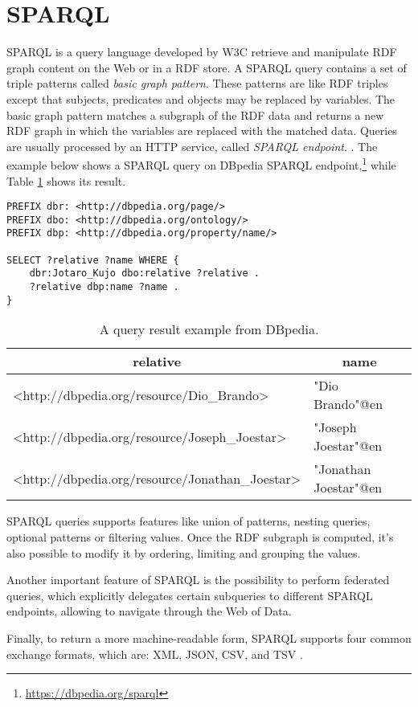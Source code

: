 \section{SPARQL}
\label{sec:sparql}

\ac{SPARQL} is a query language developed by \ac{W3C} retrieve and manipulate \ac{RDF} graph content on the Web or in a \ac{RDF} store. A \ac{SPARQL} query contains a set of triple patterns called \textit{basic graph pattern}. These patterns are like \ac{RDF} triples except that subjects, predicates and objects may be replaced by variables. The basic graph pattern matches a subgraph of the \ac{RDF} data and returns a new \ac{RDF} graph in which the variables are replaced with the matched data. Queries are usually processed by an \ac{HTTP} service, called \textit{\ac{SPARQL} endpoint}. \cite{world2013sparql}. The example below shows a \ac{SPARQL} query on DBpedia \ac{SPARQL} endpoint,\footnote{\url{https://dbpedia.org/sparql}} while Table \ref{tab:sparql-example} shows its result.

\begin{verbatim}
PREFIX dbr: <http://dbpedia.org/page/>
PREFIX dbo: <http://dbpedia.org/ontology/>
PREFIX dbp: <http://dbpedia.org/property/name/>

SELECT ?relative ?name WHERE {
    dbr:Jotaro_Kujo dbo:relative ?relative .
    ?relative dbp:name ?name .
}
\end{verbatim}

\begin{table}[!ht]
    \centering
    \begin{tabular}{|l|l|}
        \hline
        \multicolumn{1}{|c|}{\textbf{relative}} & \multicolumn{1}{c|}{\textbf{name}} \\ \hline
        <http://dbpedia.org/resource/Dio\_Brando> & "Dio Brando"@en \\ \hline
        <http://dbpedia.org/resource/Joseph\_Joestar> & "Joseph Joestar"@en \\ \hline
        <http://dbpedia.org/resource/Jonathan\_Joestar> & "Jonathan Joestar"@en \\ \hline
    \end{tabular}
    \caption{A query result example from DBpedia.}
    \label{tab:sparql-example}
\end{table}

\ac{SPARQL} queries supports features like union of patterns, nesting queries, optional patterns or filtering values. Once the \ac{RDF} subgraph is computed, it's also possible to modify it by ordering, limiting and grouping the values.

Another important feature of \ac{SPARQL} is the possibility to perform federated queries, which explicitly delegates certain subqueries to different \ac{SPARQL} endpoints, allowing to navigate through the Web of Data.

Finally, to return a more machine-readable form, \ac{SPARQL} supports four common exchange formats, which are: \ac{XML}, \ac{JSON}, \ac{CSV}, and \ac{TSV} \cite{world2013sparql}.